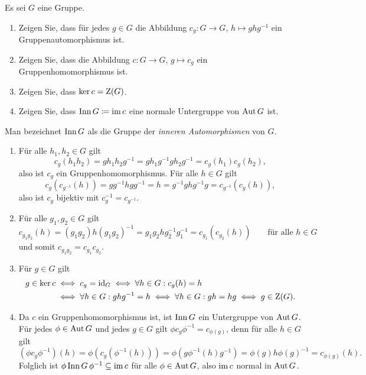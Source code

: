 \begin{question}[subtitle = Innere Automorphismen]
  \label{question: inner automorphims}
  Es sei $G$ eine Gruppe.
  \begin{enumerate}
    \item
      Zeigen Sie, dass für jedes $g \in G$ die Abbildung $c_g \colon G \to G$, $h \mapsto g h g^{-1}$ ein Gruppenautomorphismus ist.
    \item
      Zeigen Sie, dass die Abbildung $c \colon G \to G$, $g \mapsto c_g$ ein Gruppenhomomorphismus ist.
    \item
      Zeigen Sie, dass $\ker c = \operatorname{Z}(G)$.
    \item
      Zeigen Sie, dass $\operatorname{Inn} G \coloneqq \operatorname{im} c$ eine normale Untergruppe von $\operatorname{Aut} G$ ist.
  \end{enumerate}
  Man bezeichnet $\operatorname{Inn} G$ als die Gruppe der \emph{inneren Automorphismen} von $G$.
\end{question}


\begin{solution}
  \begin{enumerate}
    \item
      Für alle $h_1, h_2 \in G$ gilt
      \[
          c_g(h_1 h_2)
        = g h_1 h_2 g^{-1}
        = g h_1 g^{-1} g h_2 g^{-1}
        = c_g(h_1) c_g(h_2),
      \]
      also ist $c_g$ ein Gruppenhomomorphismus.
      Für alle $h \in G$ gilt
      \[
          c_g( c_{g^{-1}}(h) )
        = g g^{-1} h g g^{-1}
        = h
        = g^{-1} g h g^{-1} g
        = c_{g^{-1}}( c_g(h) ),
      \]
      also ist $c_g$ bijektiv mit $c_g^{-1} = c_{g^{-1}}$.
    \item
      Für alle $g_1, g_2 \in G$ gilt
      \[
          c_{g_1 g_2}(h)
        = (g_1 g_2) h (g_1 g_2)^{-1}
        = g_1 g_2 h g_2^{-1} g_1^{-1}
        = c_{g_1}( c_{g_2}(h) )
        \qquad
        \text{für alle $h \in G$}
      \]
      und somit $c_{g_1 g_2} = c_{g_1} c_{g_2}$.
    \item
      Für $g \in G$ gilt
      \begin{align*}
              g \in \ker c
        &\iff c_g = \operatorname{id}_G
         \iff \forall h \in G: c_g(h) = h
        \\
        &\iff \forall h \in G: ghg^{-1} = h
         \iff \forall h \in G: gh = hg
         \iff g \in \operatorname{Z}(G).
      \end{align*}
    \item
      Da $c$ ein Gruppenhomomorphismus ist, ist $\operatorname{Inn} G$ ein Untergruppe von $\operatorname{Aut} G$.
      Für jedes $\phi \in \operatorname{Aut} G$ und jedes $g \in G$ gilt $\phi c_g \phi^{-1} = c_{\phi(g)}$, denn für alle $h \in G$ gilt
      \[
        (\phi c_g \phi^{-1})(h)
        = \phi( c_g( \phi^{-1}(h) ) )
        = \phi(g \phi^{-1}(h) g^{-1})
        = \phi(g) h \phi(g)^{-1}
        = c_{\phi(g)}(h).
      \]
      Folglich ist $\phi \, {\operatorname{Inn} G} \, \phi^{-1} \subseteq \operatorname{im} c$ für alle $\phi \in \operatorname{Aut} G$, also $\operatorname{im} c$ normal in $\operatorname{Aut} G$.
  \end{enumerate}
\end{solution}


